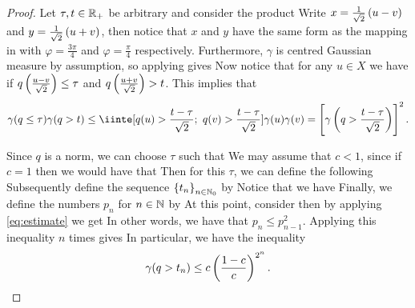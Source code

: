 \documentclass[../main.tex]{subfiles}
\begin{document}
\begin{proof}
Let $\tau, t\in\operatorname{\mathbb{R}}_+$ be arbitrary and consider the product  Write $x = \frac{1}{\sqrt{2}}\del{u-v}$ and $y = \frac{1}{\sqrt{2}}\del{u+v}$, then notice that $x$ and $y$ have the same form as the mapping in  with $\varphi = \frac{3\pi}{4}$ and $\varphi = \frac{\pi}{4}$ respectively. Furthermore, $\gamma$ is centred Gaussian measure by assumption, so applying  gives  Now notice that for any $u\in X$ we have  if $q\del{\frac{u-v}{\sqrt{2}}}\leq\tau$ and $q\del{\frac{u+v}{\sqrt{2}}}>t$. This implies that 
\begin{equation}
    \label{eq:estimate}
    \gamma(q\leq\tau)\gamma(q>t)\leq\iinte[q(u)>\frac{t-\tau}{\sqrt{2}}; \ q(v)>\frac{t-\tau}{\sqrt{2}}]{}{\gamma(u)}{\gamma(v)} = \sbr{\gamma\del{q>\frac{t-\tau}{\sqrt{2}}}}^2.
\end{equation}

Since $q$ is a norm, we can choose $\tau$ such that  We may assume that $c<1$, since if $c = 1$ then we would have that  Then for this $\tau$, we can define the following  Subsequently define the sequence $\cbr{t_n}_{n\in\N_0}$ by  Notice that we have  Finally, we define the numbers $p_n$ for $n\in\operatorname{\mathbb{N}}$ by  At this point, consider  then by applying \eqref{eq:estimate} we get  In other words, we have that $p_n\leq p_{n-1}^2$. Applying this inequality $n$ times gives  In particular, we have the inequality 
\begin{equation}
    \label{eq:gamma_bound}
    \gamma(q>t_n) \leq c\del{\frac{1-c}{c}}^{2^n}.
\end{equation}


\end{proof}
\end{document}
